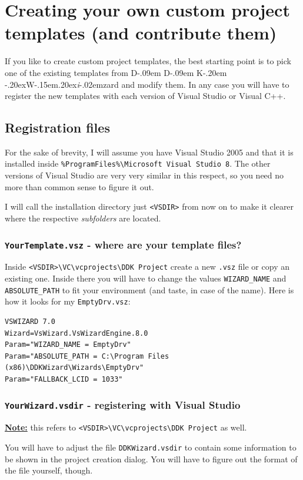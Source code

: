 \documentclass[a4paper,titlepage]{report}
\def\ddkwiz{D\kern-.09em D\kern-.09em K\kern-.20em \raise-.20ex\hbox{W}\kern-.15em\raise.20ex\hbox{\it{i}}\kern-.02em{zard}}
\begin{document}
\chapter{Creating your own custom project templates (and contribute them)}
If you like to create custom project templates, the best starting point is to pick one
of the existing templates from \ddkwiz{} and modify them. In any case you will have to
register the new templates with each version of Visual Studio or Visual C++.

\section{Registration files}
For the sake of brevity, I will assume you have Visual Studio 2005 and that it is installed
inside \verb+%ProgramFiles%\Microsoft Visual Studio 8+. The other versions of Visual Studio
are very very similar in this respect, so you need no more than common
sense to figure it out.

I will call the installation directory just \verb+<VSDIR>+ from now on to make it clearer
where the respective \emph{subfolders} are located.

\subsection{\texttt{YourTemplate.vsz} - where are your template files?}
Inside \verb+<VSDIR>\VC\vcprojects\DDK Project+ create a new \texttt{.vsz} file or copy
an existing one. Inside there you will have to change the values \verb+WIZARD_NAME+
and \verb+ABSOLUTE_PATH+ to fit your environment (and taste, in case of the name).
Here is how it looks for my \texttt{EmptyDrv.vsz}:\label{sec:templatepath}

\begin{verbatim}
VSWIZARD 7.0
Wizard=VsWizard.VsWizardEngine.8.0
Param="WIZARD_NAME = EmptyDrv"
Param="ABSOLUTE_PATH = C:\Program Files (x86)\DDKWizard\Wizards\EmptyDrv"
Param="FALLBACK_LCID = 1033"
\end{verbatim}

\subsection{\texttt{YourWizard.vsdir} - registering with Visual Studio}
\underline{\textbf{Note:}} this refers to \verb+<VSDIR>\VC\vcprojects\DDK Project+
as well.

You will have to adjust the file \texttt{DDKWizard.vsdir} to contain
some information to be shown in the project creation dialog. You will have to
figure out the format of the file yourself, though.
\end{document}
